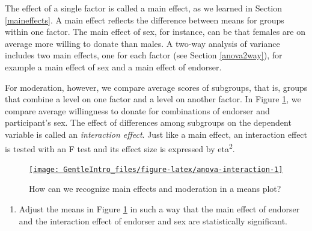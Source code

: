 \documentclass[a4paper]{book}
\providecommand{\tightlist}{%
  \setlength{\itemsep}{0pt}\setlength{\parskip}{0pt}}
\theoremstyle{definition}
\theoremstyle{definition}
\theoremstyle{definition}
\theoremstyle{remark}
\begin{document}
The effect of a single factor is called a main effect, as we learned in
Section \ref{maineffects}. A main effect reflects the difference between
means for groups within one factor. The main effect of sex, for
instance, can be that females are on average more willing to donate than
males. A two-way analysis of variance includes two main effects, one for
each factor (see Section \ref{anova2way}), for example a main effect of
sex and a main effect of endorser.

For moderation, however, we compare average scores of subgroups, that
is, groups that combine a level on one factor and a level on another
factor. In Figure \ref{fig:anova-interaction}, we compare average
willingness to donate for combinations of endorser and participant's
sex. The effect of differences among subgroups on the dependent variable
is called an \emph{interaction effect}. Just like a main effect, an
interaction effect is tested with an F test and its effect size is
expressed by eta\textsuperscript{2}.

\begin{figure}[H]
\href{http://82.196.4.233:3838/apps/anova-interaction/}{\texttt{[image: GentleIntro\_files/figure-latex/anova-interaction-1]} }\caption{How can we recognize main effects and moderation in a means plot?}\label{fig:anova-interaction}
\end{figure}

\begin{enumerate}
\def\labelenumi{\arabic{enumi}.}
\tightlist
\item
  Adjust the means in Figure \ref{fig:anova-interaction} in such a way
  that the main effect of endorser and the interaction effect of
  endorser and sex are statistically significant.
\end{enumerate}
\end{document}
